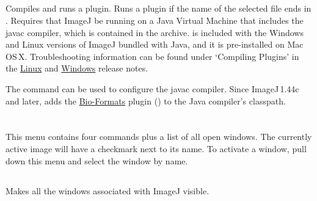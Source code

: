 \subsection{\protect{}\label{sub:Compile-and-Run...}}

Compiles and runs a plugin. Runs a plugin if the name
of the selected file ends in . Requires that
ImageJ be running on a Java Virtual Machine that includes the javac
compiler, which is contained in the  archive.
 is included with the Windows and Linux versions
of ImageJ bundled with Java, and it is pre-installed on Mac OS\,X.
Troubleshooting information can be found under `Compiling Plugins'
in the \href{http://imagej.nih.gov/ij/docs/install/linux.html\#compile}{Linux}
and \href{http://imagej.nih.gov/ij/docs/install/windows.html\#compile}{Windows}
release notes.

The 
command can be used to configure the javac compiler. Since ImageJ\,1.44c
and later,  adds
the \href{http://loci.wisc.edu/software/bio-formats}{Bio-Formats}
plugin () to the Java compiler's classpath.

\clearpage{}


\section{\protect{}\label{sec:WindowMenu}}

This menu contains four commands plus a list of all open windows.
The currently active image will have a checkmark next to its name.
To activate a window, pull down this menu and select the window by
name.


\subsection{\protect\userinterface{Show All {[}~{]}~{]}}\label{sub:ShowAll}}

Makes all the windows associated with ImageJ visible.


\subsection{\protect{}\label{sub:PutBehind}}

